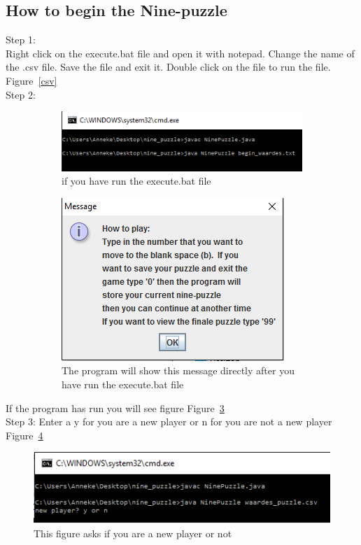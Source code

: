 \documentclass[10pt]{article}
\begin{document}
\subsection{How to begin the Nine-puzzle}
Step 1:
\\Right click on the execute.bat file and open it with notepad.
Change the name of the .csv file.  Save the file and exit it.  Double click on the file to run the file. Figure~\ref{csv}
\\Step 2:
\begin{figure}[b!]
    \centering
    \begin{subfigure}[b]{0.5\textwidth}
        \centering
        \includegraphics[scale=0.8]{./Prente/begincmd.png}
        \caption{if you have run the execute.bat file}
        \label{begincmd}
    \end{subfigure}%
 
    \begin{subfigure}[b]{0.5\textwidth}
        \centering
        \includegraphics[scale=0.8]{./Prente/MessageBegin.png}
        \caption{The program will show this message directly after you have run the execute.bat file}
        \label{MessageBegin}
    \end{subfigure}
    \caption{\label{1}}
   \end{figure}
If the program has run you will see figure Figure~\ref{1}
\\Step 3: Enter a y for you are a new player or n for you are not a new player Figure~\ref{prent1}
\begin{figure}
\centering
 \includegraphics[scale=0.8]{./Prente/prent1.png}
  \caption{This figure asks if you are a new player or not}
  \label{prent1}
\end{figure}
\end{document}
